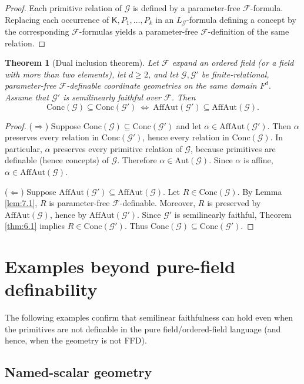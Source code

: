 \documentclass[11pt,a4paper]{article}
\newcommand{\G}{\mathcal{G}}
\newcommand{\F}{\mathcal{F}}
\newtheorem{theorem}{Theorem}[section]
\theoremstyle{definition}
\begin{document}
\begin{proof}
	Each primitive relation of $\G$ is defined by a
parameter-free $\F$-formula. Replacing each occurrence of
$\mathsf K,P_1,\dots,P_k$ in an $L_{\G}$-formula defining a concept by
the corresponding $\F$-formulas yields a parameter-free
$\F$-definition of the same relation.
\end{proof}


\begin{theorem}[Dual inclusion theorem]
	\label{thm:7.2}
Let $\F$ expand
an ordered field (or a field with more than two elements), let $d\ge 2$, and let
$\G, \G'$ be finite-relational, parameter-free
$\F$-definable coordinate geometries on the same domain
$F^d$. Assume that $\G'$ is semilinearly faithful over
$\F$. Then \[
\mathrm{Conc}(\G)\subseteq \mathrm{Conc}(\G')\ \Longleftrightarrow\ \mathrm{AffAut}(\G')\subseteq \mathrm{AffAut}(\G).
\]
\end{theorem}

\begin{proof}
($\Rightarrow$) Suppose
$\mathrm{Conc}(\G)\subseteq \mathrm{Conc}(\G')$ and let
$\alpha\in \mathrm{AffAut}(\G')$. Then $\alpha$ preserves every
relation in $\mathrm{Conc}(\G')$, hence every relation in
$\mathrm{Conc}(\G)$. In particular, $\alpha$ preserves every
primitive relation of $\G$, because primitives are definable (hence
concepts) of $\G$. Therefore $\alpha\in \mathrm{Aut}(\G)$. Since
$\alpha$ is affine, $\alpha\in \mathrm{AffAut}(\G)$.

($\Leftarrow$) Suppose
$\mathrm{AffAut}(\G')\subseteq \mathrm{AffAut}(\G)$. Let
$R\in \mathrm{Conc}(\G)$. By Lemma \ref{lem:7.1}, $R$ is parameter-free
$\F$-definable. Moreover, $R$ is preserved by
$\mathrm{AffAut}(\G)$, hence by $\mathrm{AffAut}(\G')$. Since
$\G'$ is semilinearly faithful, Theorem \ref{thm:6.1} implies
$R\in \mathrm{Conc}(\G')$. Thus
$\mathrm{Conc}(\G)\subseteq \mathrm{Conc}(\G')$.
\end{proof}


\section{Examples beyond pure-field definability}
\label{sec:8}

The following examples confirm that semilinear faithfulness can hold even when the primitives are not definable in the pure field/ordered-field language (and hence, when the geometry is not FFD).

\subsection{Named-scalar geometry}
\label{sec:8.1}
\end{document}
